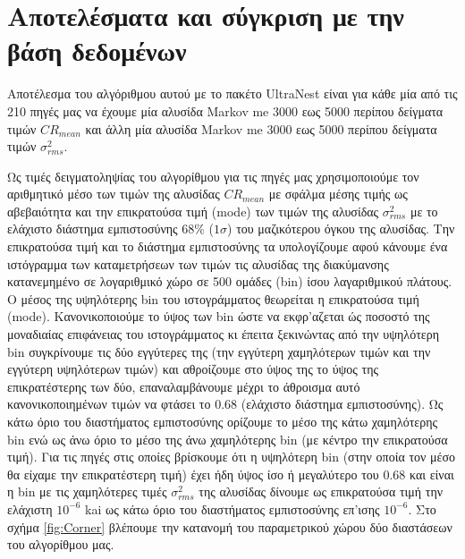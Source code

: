 
\section{Αποτελέσματα και σύγκριση με την βάση δεδομένων}

Αποτέλεσμα του αλγόριθμου αυτού με το πακέτο \textlatin{UltraNest} είναι για κάθε μία από τις 210 πηγές μας να έχουμε μία αλυσίδα \textlatin{Markov} me 3000 εως 5000 περίπου δείγματα τιμών $CR_{mean}$ και άλλη μία αλυσίδα \textlatin{Markov} me 3000 εως 5000 περίπου δείγματα τιμών $\sigma_{rms}^2$.

Ως τιμές δειγματοληψίας του αλγορίθμου για τις πηγές μας χρησιμοποιούμε τον αριθμητικό μέσο των τιμών της αλυσίδας $CR_{mean}$ με σφάλμα μέσης τιμής ως αβεβαιότητα και την επικρατούσα τιμή (\textlatin{mode}) των τιμών της αλυσίδας $\sigma_{rms}^2$ με το ελάχιστο διάστημα εμπιστοσύνης $68\%$ ($1\sigma$) του μαζικότερου όγκου της αλυσίδας. Την επικρατούσα τιμή και το διάστημα εμπιστοσύνης τα υπολογίζουμε αφού κάνουμε ένα ιστόγραμμα των καταμετρήσεων των τιμών τις αλυσίδας της διακύμανσης κατανεμημένο σε λογαριθμικό χώρο σε 500 ομάδες \textlatin{(bin)} ίσου λαγαριθμικού πλάτους. Ο μέσος της υψηλότερης \textlatin{bin} του ιστογράμματος θεωρείται η επικρατούσα τιμή \textlatin{(mode)}. Κανονικοποιούμε το ύψος των \textlatin{bin} ώστε να εκφρ'αζεται ώς ποσοστό της μοναδιαίας επιφάνειας του ιστογράμματος κι έπειτα ξεκινώντας από την υψηλότερη \textlatin{bin} συγκρίνουμε τις δύο εγγύτερες της (την εγγύτερη χαμηλότερων τιμών και την εγγύτερη υψηλότερων τιμών) και αθροίζουμε στο ύψος της το ύψος της επικρατέστερης των δύο, επαναλαμβάνουμε μέχρι το άθροισμα αυτό κανονικοποιημένων τιμών να φτάσει το $0.68$ (ελάχιστο διάστημα εμπιστοσύνης). Ως κάτω όριο του διαστήματος εμπιστοσύνης ορίζουμε το μέσο της κάτω χαμηλότερης \textlatin{bin} ενώ ως άνω όριο το μέσο της άνω χαμηλότερης \textlatin{bin} (με κέντρο την επικρατούσα τιμή). Για τις πηγές στις οποίες βρίσκουμε ότι η υψηλότερη \textlatin{bin} (στην οποία τον μέσο θα είχαμε την επικρατέστερη τιμή) έχει ήδη ύψος ίσο ή μεγαλύτερο του $0.68$ και είναι η \textlatin{bin} με τις χαμηλότερες τιμές $\sigma_{rms}^2$ της αλυσίδας δίνουμε ως επικρατούσα τιμή την ελάχιστη $10^{-6}$ kai ως κάτω όριο του διαστήματος εμπιστοσύνης επ'ισης $10^{-6}$. Στο σχήμα \ref{fig:Corner} βλέπουμε την κατανομή του παραμετρικού χώρου δύο διαστάσεων του αλγορίθμου μας. 

